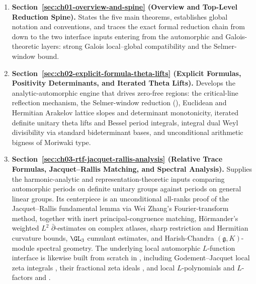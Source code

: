 \begin{enumerate}
  \item \textbf{Section~\ref{sec:ch01-overview-and-spine} (Overview and
  Top-Level Reduction Spine).}
  States the five main theorems, establishes global notation and conventions,
  and traces the exact formal reduction chain from  down to the
  two interface inputs entering from the automorphic and Galois-theoretic
  layers: strong Galois local--global compatibility and the Selmer-window
  bound.

  \item \textbf{Section~\ref{sec:ch02-explicit-formula-theta-lifts} (Explicit
  Formulas, Positivity Determinants, and Iterated Theta Lifts).}
  Develops the analytic-automorphic engine that drives zero-free regions: the
  critical-line reflection mechanism, the Selmer-window reduction
  (), Euclidean and Hermitian Arakelov lattice
  slopes and determinant monotonicity, iterated definite unitary theta lifts
  and Bessel period integrals, integral dual Weyl divisibility via standard
  bideterminant bases, and unconditional arithmetic bigness of Moriwaki type.

  \item \textbf{Section~\ref{sec:ch03-rtf-jacquet-rallis-analysis}
  (Relative Trace Formulas, Jacquet--Rallis Matching, and Spectral Analysis).}
  Supplies the harmonic-analytic and representation-theoretic inputs comparing
  automorphic periods on definite unitary groups against periods on general
  linear groups.
  Its centerpiece is an unconditional all-ranks proof of the Jacquet--Rallis
  fundamental lemma via Wei Zhang's Fourier-transform method, together with
  inert principal-congruence matching, H\"ormander's weighted $L^2$
  $\bar{\partial}$-estimates on complex atlases, sharp restriction and
  Hermitian curvature bounds, $\GL_3$ cumulant estimates, and Harish-Chandra
  $(\mathfrak{g}, K)$-module spectral geometry.
  The underlying local automorphic $L$-function interface is likewise built
  from scratch in , including
  Godement--Jacquet local zeta integrals
  ,
  their fractional zeta ideals
  ,
  and local $L$-polynomials and $L$-factors
   and
  .


\end{enumerate}
